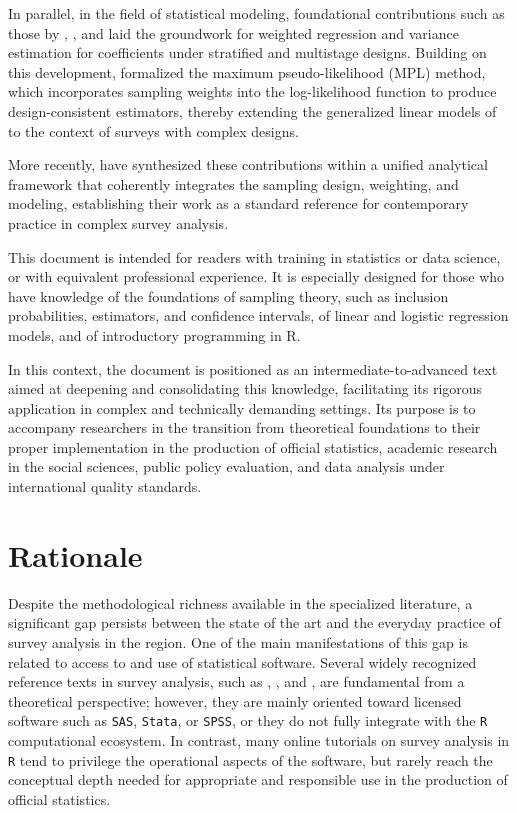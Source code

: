 \documentclass[
  english,
  12pt,
]{book}
\begin{document}
In parallel, in the field of statistical modeling, foundational contributions such as those by \citet{kish1974inference}, \citet{fuller1975regression}, and \citet{binder1983variances} laid the groundwork for weighted regression and variance estimation for coefficients under stratified and multistage designs. Building on this development, \citet{pfeffermann1993role} formalized the maximum pseudo-likelihood (MPL) method, which incorporates sampling weights into the log-likelihood function to produce design-consistent estimators, thereby extending the generalized linear models of \citet{nelder1972generalized} to the context of surveys with complex designs.

More recently, \citet{heeringa2017applied} have synthesized these contributions within a unified analytical framework that coherently integrates the sampling design, weighting, and modeling, establishing their work as a standard reference for contemporary practice in complex survey analysis.

This document is intended for readers with training in statistics or data science, or with equivalent professional experience. It is especially designed for those who have knowledge of the foundations of sampling theory, such as inclusion probabilities, estimators, and confidence intervals, of linear and logistic regression models, and of introductory programming in R.

In this context, the document is positioned as an intermediate-to-advanced text aimed at deepening and consolidating this knowledge, facilitating its rigorous application in complex and technically demanding settings. Its purpose is to accompany researchers in the transition from theoretical foundations to their proper implementation in the production of official statistics, academic research in the social sciences, public policy evaluation, and data analysis under international quality standards.

\section{Rationale}\label{rationale}

Despite the methodological richness available in the specialized literature, a significant gap persists between the state of the art and the everyday practice of survey analysis in the region. One of the main manifestations of this gap is related to access to and use of statistical software. Several widely recognized reference texts in survey analysis, such as \citet{heeringa2017applied}, \citet{cochran1977sampling}, and \citet{sarndal2003model}, are fundamental from a theoretical perspective; however, they are mainly oriented toward licensed software such as \texttt{SAS}, \texttt{Stata}, or \texttt{SPSS}, or they do not fully integrate with the \texttt{R} computational ecosystem. In contrast, many online tutorials on survey analysis in \texttt{R} tend to privilege the operational aspects of the software, but rarely reach the conceptual depth needed for appropriate and responsible use in the production of official statistics.
\end{document}
